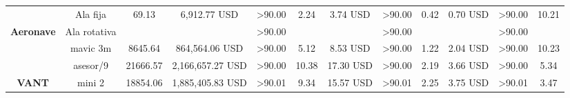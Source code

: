 \begin{table}[]
\begin{tabular}{cc|ccc|ccc|ccc|c|}
    \multicolumn{1}{|c|}{\cellcolor[HTML]{9698ED}} &
      \cellcolor[HTML]{9698ED}Ala fija &
      \multicolumn{1}{c|}{69.13} &
      \multicolumn{1}{c|}{6,912.77 USD} &
      \textgreater{}90.00 &
      \multicolumn{1}{c|}{2.24} &
      \multicolumn{1}{c|}{3.74 USD} &
      \textgreater{}90.00 &
      \multicolumn{1}{c|}{0.42} &
      \multicolumn{1}{c|}{0.70 USD} &
      \textgreater{}90.00 &
      10.21 \\ \cline{2-12} 
    \multicolumn{1}{|c|}{\multirow{-2}{*}{\cellcolor[HTML]{9698ED}\textbf{Aeronave}}} &
      \cellcolor[HTML]{9698ED}Ala rotativa &
      \multicolumn{1}{c|}{} &
      \multicolumn{1}{c|}{} &
      \textgreater{}90.00 &
      \multicolumn{1}{c|}{} &
      \multicolumn{1}{c|}{} &
      \textgreater{}90.00 &
      \multicolumn{1}{c|}{} &
      \multicolumn{1}{c|}{} &
      \textgreater{}90.00 &
       \\ \hline
    \multicolumn{1}{|c|}{\cellcolor[HTML]{9698ED}} &
      \cellcolor[HTML]{9698ED}mavic 3m &
      \multicolumn{1}{c|}{8645.64} &
      \multicolumn{1}{c|}{864,564.06 USD} &
      \textgreater{}90.00 &
      \multicolumn{1}{c|}{5.12} &
      \multicolumn{1}{c|}{8.53 USD} &
      \textgreater{}90.00 &
      \multicolumn{1}{c|}{1.22} &
      \multicolumn{1}{c|}{2.04 USD} &
      \textgreater{}90.00 &
      10.23 \\ \cline{2-12} 
    \multicolumn{1}{|c|}{\cellcolor[HTML]{9698ED}} &
      \cellcolor[HTML]{9698ED}asesor/9 &
      \multicolumn{1}{c|}{21666.57} &
      \multicolumn{1}{c|}{2,166,657.27 USD} &
      \textgreater{}90.00 &
      \multicolumn{1}{c|}{10.38} &
      \multicolumn{1}{c|}{17.30 USD} &
      \textgreater{}90.00 &
      \multicolumn{1}{c|}{2.19} &
      \multicolumn{1}{c|}{3.66 USD} &
      \textgreater{}90.00 &
      5.34 \\ \cline{2-12} 
    \multicolumn{1}{|c|}{\multirow{-3}{*}{\cellcolor[HTML]{9698ED}\textbf{VANT}}} &
      \cellcolor[HTML]{9698ED}mini 2 &
      \multicolumn{1}{c|}{18854.06} &
      \multicolumn{1}{c|}{1,885,405.83 USD} &
      \textgreater{}90.01 &
      \multicolumn{1}{c|}{9.34} &
      \multicolumn{1}{c|}{15.57 USD} &
      \textgreater{}90.01 &
      \multicolumn{1}{c|}{2.25} &
      \multicolumn{1}{c|}{3.75 USD} &
      \textgreater{}90.01 &
      3.47 \\ \hline
    \end{tabular}%

\end{table}
